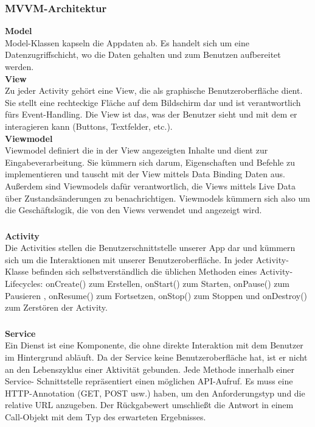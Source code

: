 \subsubsection{MVVM-Architektur}

\textbf{Model}\\
Model-Klassen kapseln die Appdaten ab. Es handelt sich um eine Datenzugriffschicht, wo die Daten gehalten und zum Benutzen aufbereitet werden. \\

\textbf{View}\\
Zu jeder Activity gehört eine View, die als graphische Benutzeroberfläche dient. Sie stellt eine rechteckige Fläche auf dem Bildschirm dar und ist verantwortlich fürs Event-Handling. Die View ist das, was der Benutzer sieht und mit dem er interagieren kann (Buttons, Textfelder, etc.).\\

\textbf{Viewmodel}\\
Viewmodel definiert die in der View angezeigten Inhalte und dient zur Eingabeverarbeitung. Sie kümmern sich darum, Eigenschaften und Befehle zu implementieren und tauscht mit der View mittels Data Binding Daten aus. Außerdem sind Viewmodels dafür verantwortlich, die Views mittels Live Data über Zustandsänderungen zu benachrichtigen. Viewmodels kümmern sich also um die Geschäftslogik, die von den Views verwendet und angezeigt wird.\\

\subsubsection{}   
\textbf{Activity}\\
Die Activities stellen die Benutzerschnittstelle unserer App dar und kümmern sich um die Interaktionen mit unserer Benutzeroberfläche. In jeder Activity-Klasse befinden sich selbstverständlich die üblichen Methoden eines Activity-Lifecycles: onCreate() zum Erstellen, onStart() zum Starten, onPause() zum Pausieren , onResume() zum Fortsetzen, onStop() zum Stoppen und onDestroy() zum Zerstören der Activity.

\subsubsection{} 
\textbf{Service}\\
Ein Dienst ist eine Komponente, die ohne direkte Interaktion mit dem Benutzer im Hintergrund abläuft. Da der Service keine Benutzeroberfläche hat, ist er nicht an den Lebenszyklus einer Aktivität gebunden.
Jede Methode innerhalb einer Service- Schnittstelle repräsentiert einen möglichen API-Aufruf. Es muss eine HTTP-Annotation (GET, POST usw.) haben, um den Anforderungstyp und die relative URL anzugeben. Der Rückgabewert umschließt die Antwort in einem Call-Objekt mit dem Typ des erwarteten Ergebnisses.



